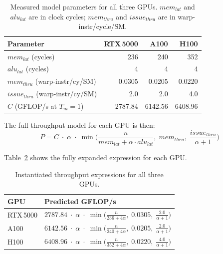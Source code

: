 \begin{table}[t]
  \centering
  \caption{Measured model parameters for all three GPUs.
    $mem_{lat}$ and $alu_{lat}$ are in clock cycles;
    $mem_{thru}$ and $issue_{thru}$ are in warp-instr/cycle/SM.}
  \label{tab:params}
  \begin{tabular}{lrrr}
    \toprule
    \textbf{Parameter} & \textbf{RTX\,5000} & \textbf{A100} & \textbf{H100} \\
    \midrule
    $mem_{lat}$ (cycles)        & 236   & 240   & 352   \\
    $alu_{lat}$ (cycles)        & 4     & 4     & 4     \\
    $mem_{thru}$ (warp-instr/cy/SM) & 0.0305 & 0.0205 & 0.0220 \\
    $issue_{thru}$ (warp-instr/cy/SM) & 2.0 & 2.0 & 4.0 \\
    \midrule
    $C$ (GFLOP/s at $T_m = 1$) & 2787.84 & 6142.56 & 6408.96 \\
    \bottomrule
  \end{tabular}
\end{table}

The full throughput model for each GPU is then:
%
\begin{equation}
P = C \;\cdot\; \alpha \;\cdot\; \min\!\biggl(
  \frac{n}{mem_{lat} + \alpha \cdot alu_{lat}},\;
  mem_{thru},\;
  \frac{issue_{thru}}{\alpha + 1}
\biggr)
\label{eq:full_model}
\end{equation}

Table~\ref{tab:expressions} shows the fully expanded expression for each GPU.

\begin{table}[t]
  \centering
  \caption{Instantiated throughput expressions for all three GPUs.}
  \label{tab:expressions}
  \begin{tabular}{|l|p{7.0cm}|}
    \hline
    \textbf{GPU} & \textbf{Predicted GFLOP/s} \\
    \hline
    RTX\,5000 &
    $2787.84 \;\cdot\; \alpha \;\cdot\;
    \min\!\bigl(\frac{n}{236 + 4\alpha},\;
    0.0305,\;
    \frac{2.0}{\alpha+1}\bigr)$ \\[6pt]
    \hline
    A100 &
    $6142.56 \;\cdot\; \alpha \;\cdot\;
    \min\!\bigl(\frac{n}{240 + 4\alpha},\;
    0.0205,\;
    \frac{2.0}{\alpha+1}\bigr)$ \\[6pt]
    \hline
    H100 &
    $6408.96 \;\cdot\; \alpha \;\cdot\;
    \min\!\bigl(\frac{n}{352 + 4\alpha},\;
    0.0220,\;
    \frac{4.0}{\alpha+1}\bigr)$ \\[6pt]
    \hline
  \end{tabular}
\end{table}


